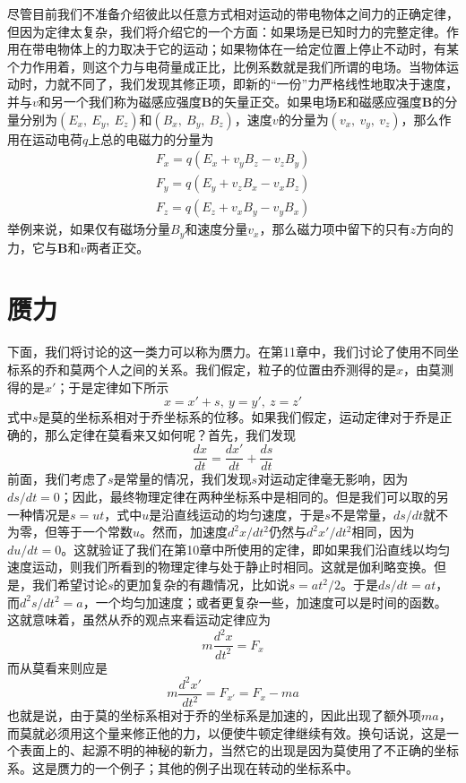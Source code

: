 尽管目前我们不准备介绍彼此以任意方式相对运动的带电物体之间力的正确定律，但因为定律太复杂，我们将介绍它的一个方面：如果场是已知时力的完整定律。作用在带电物体上的力取决于它的运动；如果物体在一给定位置上停止不动时，有某个力作用着，则这个力与电荷量成正比，比例系数就是我们所谓的电场。当物体运动时，力就不同了，我们发现其修正项，即新的“一份”力严格线性地取决于速度，并与$v$和另一个我们称为磁感应强度$\boldsymbol{B}$的矢量正交。如果电场$\boldsymbol{E}$和磁感应强度$\boldsymbol{B}$的分量分别为$(E_x,~E_y,~E_z)$和$(B_x,~B_y,~B_z)$，速度$v$的分量为$(v_x,~v_y,~v_z)$，那么作用在运动电荷$q$上总的电磁力的分量为
\begin{equation}
    \label{Eq:I:12:11}
    \begin{split}
        F_x=q(E_x+v_yB_z-v_zB_y) \\
        F_y=q(E_y+v_zB_x-v_xB_z) \\
        F_z=q(E_z+v_xB_y-v_yB_x)
    \end{split}
\end{equation}
举例来说，如果仅有磁场分量$B_y$和速度分量$v_x$，那么磁力项中留下的只有$z$方向的力，它与$\boldsymbol{B}$和$v$两者正交。

\section{赝力}

下面，我们将讨论的这一类力可以称为赝力。在第11章中，我们讨论了使用不同坐标系的乔和莫两个人之间的关系。我们假定，粒子的位置由乔测得的是$x$，由莫测得的是$x'$；于是定律如下所示
\begin{equation*}
    x=x'+s,~y=y',~z=z'
\end{equation*}
式中$s$是莫的坐标系相对于乔坐标系的位移。如果我们假定，运动定律对于乔是正确的，那么定律在莫看来又如何呢？首先，我们发现
\begin{equation*}
    \frac{dx}{dt}=\frac{dx'}{dt}+\frac{ds}{dt}
\end{equation*}
前面，我们考虑了$s$是常量的情况，我们发现$s$对运动定律毫无影响，因为$ds/dt=0$；因此，最终物理定律在两种坐标系中是相同的。但是我们可以取的另一种情况是$s=ut$，式中$u$是沿直线运动的均匀速度，于是$s$不是常量，$ds/dt$就不为零，但等于一个常数$u$。然而，加速度$d^2x/dt^2$仍然与$d^2x'/dt^2$相同，因为$du/dt=0$。这就验证了我们在第10章中所使用的定律，即如果我们沿直线以均匀速度运动，则我们所看到的物理定律与处于静止时相同。这就是伽利略变换。但是，我们希望讨论$s$的更加复杂的有趣情况，比如说$s=at^2/2$。于是$ds/dt=at$，而$d^2s/dt^2=a$，一个均匀加速度；或者更复杂一些，加速度可以是时间的函数。这就意味着，虽然从乔的观点来看运动定律应为
\begin{equation*}
    m\frac{d^2x}{dt^2}=F_x
\end{equation*}
而从莫看来则应是
\begin{equation*}
    m\frac{d^2x'}{dt^2}=F_{x'}=F_x-ma
\end{equation*}
也就是说，由于莫的坐标系相对于乔的坐标系是加速的，因此出现了额外项$ma$，而莫就必须用这个量来修正他的力，以便使牛顿定律继续有效。换句话说，这是一个表面上的、起源不明的神秘的新力，当然它的出现是因为莫使用了不正确的坐标系。这是赝力的一个例子；其他的例子出现在转动的坐标系中。

